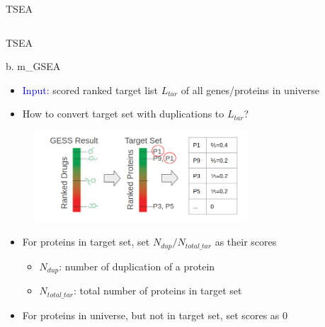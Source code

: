 \documentclass[10pt]{beamer}
\begin{document}
\begin{frame}{TSEA}
\begin{columns}
\end{columns}
\vspace{0.4cm}
\end{frame}
\begin{frame}{TSEA}
    \begin{alertblock}{b. m\_GSEA}
        \begin{itemize}
            \item \textcolor{blue}{Input:} scored ranked target list $L_{tar}$ of all genes/proteins in universe
            \item How to convert target set with duplications to $L_{tar}$?
        \end{itemize}
        \vspace{-0.5cm}
        \begin{figure}
            \centering
            \includegraphics[width=8cm]{demo/images/m_gsea.png}
        \end{figure}
        \vspace{-0.5cm}
        \begin{itemize}
            \begin{itemize}
                \item For proteins in target set, set $N_{dup}/N_{total\_tar}$ as their scores
                    \begin{itemize}
                        \item $N_{dup}$: number of duplication of a protein
                        \item $N_{total\_tar}$: total number of proteins in target set
                    \end{itemize}
                \item For proteins in universe, but not in target set, set scores as 0
            \end{itemize}
        \end{itemize}
    \end{alertblock}
\end{frame}
\end{document}
